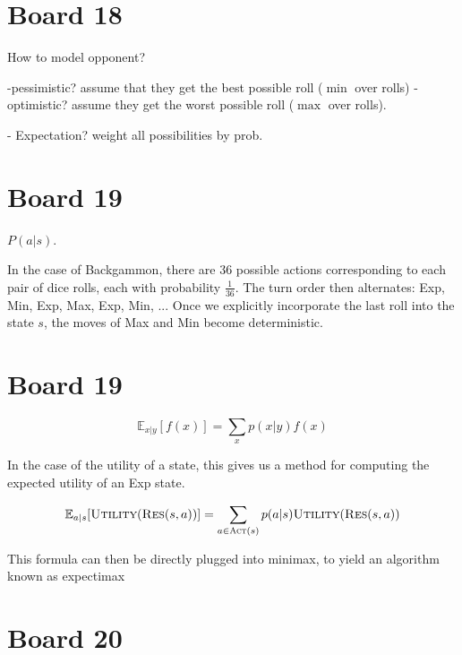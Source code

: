 \documentclass[10pt]{article}
\begin{document}
\section{Board 18}
How to model opponent?

-pessimistic?  assume that they get the best possible roll ($\min$ over rolls) 
-optimistic? assume they get the worst possible roll ($\max$ over rolls). 

- Expectation? weight all possibilities by prob.


\section{Board 19}
$P(a | s)$.


In the case of Backgammon, there are $36$ possible actions corresponding to each pair of dice rolls, each with probability $\frac{1}{36}$. The turn order then alternates: Exp, Min, Exp, Max, Exp, Min, ...
Once we explicitly incorporate the last roll into the state $s$, the moves of Max and Min become deterministic.  


\section{Board 19}

\[\mathbb{E}_{x|y}[f(x)] = \sum_{x} p(x|y)f(x) \]

In the case of the utility of a state, this gives us a method for computing the expected utility of an Exp state.




\[ \mathbb{E}_{a|s}[\mathrm{\textsc{Utility}}(\mathrm{\textsc{Res}}(s, a))]= \sum_{a \in \mathrm{\textsc{Act}}(s) } p(a | s) \mathrm{\textsc{Utility}}(\mathrm{\textsc{Res}}(s, a))  \]  

This formula can then be directly plugged into minimax, to yield an algorithm known as expectimax

\section{Board 20}
\end{document}
